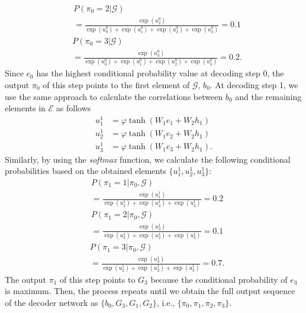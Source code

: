 \documentclass[journal]{IEEEtran}
\begin{document}
{\begin{align}
        &P(\pi_{0}=2|\bm{\mathcal{G}})\nonumber \\  \tag{A.7} &= \frac{\exp{\left(u^0_2\right)}}{\exp{\left(u^0_0\right)} + \exp{\left(u^0_1\right)} + \exp{\left(u^0_2\right)} + \exp{\left(u^0_3\right)}} = 0.1
      \end{align}
      \begin{align}
        &P(\pi_{0}=3|\bm{\mathcal{G}})\nonumber \\  \tag{A.8} &= \frac{\exp{\left(u^0_3\right)}}{\exp{\left(u^0_0\right)} + \exp{\left(u^0_1\right)} + \exp{\left(u^0_2\right)} + \exp{\left(u^0_3\right)}} = 0.2.
      \end{align}
      Since $e_0$ has the highest conditional probability value at decoding step 0, the output $\pi_0$ of this step points to the first element of $\bm{\mathcal{G}}$, $b_0$.
      At decoding step 1,  we use the same approach to calculate the correlations between $b_0$ and the remaining elements in $\bm{\mathcal{E}}$ as follows
      \begin{align}
            \tag{A.9}
	        u^1_1 &=
	        \varphi \tanh{\left(W_{1}e_1 + W_2h_1\right)} \\\tag{A.10}
	         u^1_2 &=
	        \varphi \tanh{\left(W_{1}e_2 + W_2h_1\right)} \\\tag{A.11}
	        u^1_3 &=
	        \varphi \tanh{\left(W_{1}e_3 + W_2h_1\right)}.
       \end{align}
      Similarly, by using the  \emph{softmax} function, we calculate the following conditional probabilities based on the obtained elements $\{u^1_1, u^1_2, u^1_3\}$:
      \begin{align}
        &P(\pi_{1}=1|\pi_0,\bm{\mathcal{G}})\nonumber \\  \tag{A.12} &= \frac{\exp{\left(u^1_1\right)}}{\exp{\left(u^1_2\right)} + \exp{\left(u^1_2\right)} + \exp{\left(u^1_3\right)}} = 0.2
      \end{align}
      \begin{align}
        &P(\pi_{1}=2|\pi_0,\bm{\mathcal{G}})\nonumber \\  \tag{A.13} &= \frac{\exp{\left(u^1_2\right)}}{\exp{\left(u^1_2\right)} + \exp{\left(u^1_2\right)} + \exp{\left(u^1_3\right)}} = 0.1
      \end{align}
      \begin{align}
        &P(\pi_{1}=3|\pi_0,\bm{\mathcal{G}})\nonumber \\  \tag{A.14} &= \frac{\exp{\left(u^1_3\right)}}{\exp{\left(u^1_2\right)} + \exp{\left(u^1_2\right)} + \exp{\left(u^1_3\right)}} = 0.7.
      \end{align}
      The output $\pi_1$ of this step points to $G_3$ because the conditional probability of $e_3$ is maximum. Then, the process repeats until we obtain the full output sequence of the decoder network as  $\{b_0, G_3, G_1, G_2\}$, i.e., $\{\pi_0, \pi_1, \pi_2, \pi_3\}$. }
\end{document}
